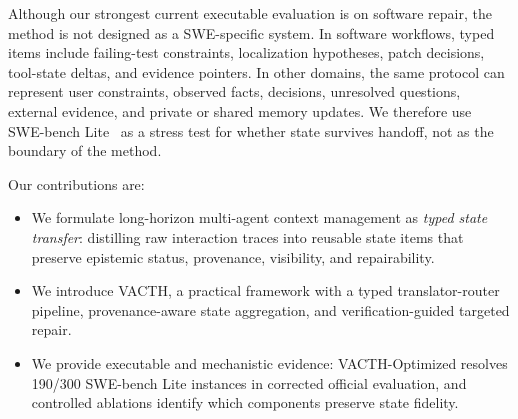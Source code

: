 \documentclass{article} %
\begin{document}
Although our strongest current executable evaluation is on software repair, the method is not designed as a SWE-specific system. In software workflows, typed items include failing-test constraints, localization hypotheses, patch decisions, tool-state deltas, and evidence pointers. In other domains, the same protocol can represent user constraints, observed facts, decisions, unresolved questions, external evidence, and private or shared memory updates. We therefore use SWE-bench Lite~\cite{jimenez2024swebench} as a stress test for whether state survives handoff, not as the boundary of the method.

Our contributions are:
\begin{itemize}
    \item We formulate long-horizon multi-agent context management as \emph{typed state transfer}: distilling raw interaction traces into reusable state items that preserve epistemic status, provenance, visibility, and repairability.
    \item We introduce VACTH, a practical framework with a typed translator-router pipeline, provenance-aware state aggregation, and verification-guided targeted repair.
    \item We provide executable and mechanistic evidence: VACTH-Optimized resolves 190/300 SWE-bench Lite instances in corrected official evaluation, and controlled ablations identify which components preserve state fidelity.
\end{itemize}
  
\end{document}
